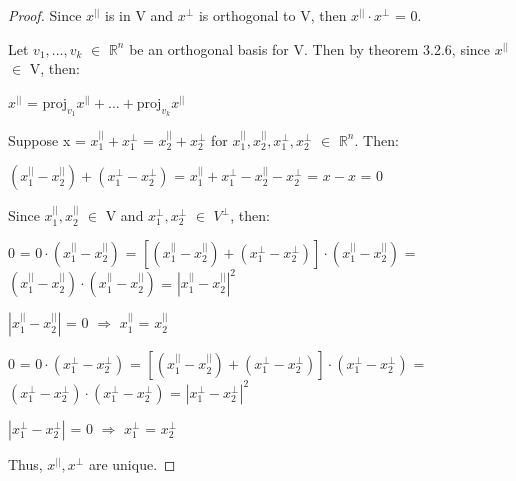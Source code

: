     \begin{proof}
        Since $x^{||}$ is in V and $x^{\perp}$ is orthogonal to V,
        then $x^{||} \cdot x^{\perp}$ = 0.

        Let $v_1,...,v_k$ $\in$ $\mathbb{R}^n$ be an orthogonal basis for V.
        Then by {\color{red} theorem 3.2.6}, since $x^{||}$ $\in$ V, then:

        \hspace{0.5cm}
        $x^{||}$ = $\text{proj}_{v_1}x^{||} + ... + \text{proj}_{v_k}x^{||}$

        Suppose x = $x^{||}_1 + x^{\perp}_1$ = $x^{||}_2 + x^{\perp}_2$
        for $x^{||}_1,x^{||}_2,x^{\perp}_1,x^{\perp}_2$ $\in$ $\mathbb{R}^n$.
        Then:

        \hspace{0.5cm}
        $(x^{||}_1 - x^{||}_2) + (x^{\perp}_1 - x^{\perp}_2)$
        = $x^{||}_1 + x^{\perp}_1 - x^{||}_2 - x^{\perp}_2$
        = $x-x$ = 0

        Since $x^{||}_1,x^{||}_2$ $\in$ V
        and $x^{\perp}_1,x^{\perp}_2$ $\in$ $V^{\perp}$, then:

        \hspace{0.5cm}
        0 = $0 \cdot (x^{||}_1 - x^{||}_2)$
        = $[(x^{||}_1 - x^{||}_2) + (x^{\perp}_1 - x^{\perp}_2)]
            \cdot (x^{||}_1 - x^{||}_2)$
        = $(x^{||}_1 - x^{||}_2) \cdot (x^{||}_1 - x^{||}_2)$
        = $|x^{||}_1 - x^{||}_2|^2$

        \hspace{0.5cm}
        $|x^{||}_1 - x^{||}_2|$ = 0
        \hspace{0.5cm}
        $\Rightarrow$
        \hspace{0.5cm}
        $x^{||}_1$ = $x^{||}_2$

        \vspace{0.1cm}

        \hspace{0.5cm}
        0 = $0 \cdot (x^{\perp}_1 - x^{\perp}_2)$
        = $[(x^{||}_1 - x^{||}_2) + (x^{\perp}_1 - x^{\perp}_2)]
            \cdot (x^{\perp}_1 - x^{\perp}_2)$
        = $(x^{\perp}_1 - x^{\perp}_2) \cdot (x^{\perp}_1 - x^{\perp}_2)$
        = $|x^{\perp}_1 - x^{\perp}_2|^2$

        \hspace{0.5cm}
        $|x^{\perp}_1 - x^{\perp}_2|$ = 0
        \hspace{0.5cm}
        $\Rightarrow$
        \hspace{0.5cm}
        $x^{\perp}_1$ = $x^{\perp}_2$

        Thus, $x^{||},x^{\perp}$ are unique.
    \end{proof}

